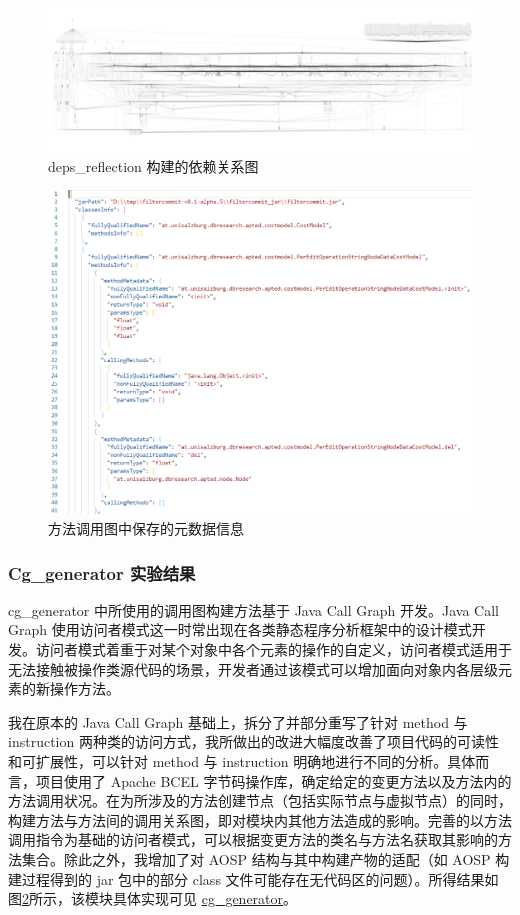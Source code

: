 \begin{figure}[htb]
    \centering
    \includegraphics[width=.9\textwidth]{figures/design-view.png}
    \caption{deps\_reflection 构建的依赖关系图}
    \label{fig:design-deps-reflection}
\end{figure}

\begin{figure}[htb]
    \centering
    \includegraphics[width=.6\textwidth]{figures/design-cg-generator.png}
    \caption{方法调用图中保存的元数据信息}
    \label{fig:design-cg-generator}
\end{figure}

\subsubsection{Cg\_generator 实验结果}

cg\_generator 中所使用的调用图构建方法基于 Java Call Graph 开发。Java Call Graph 使用访问者模式这一时常出现在各类静态程序分析框架中的设计模式开发。访问者模式着重于对某个对象中各个元素的操作的自定义，访问者模式适用于无法接触被操作类源代码的场景，开发者通过该模式可以增加面向对象内各层级元素的新操作方法\cite{gamma1994design}。

我在原本的 Java Call Graph 基础上，拆分了并部分重写了针对 method 与 instruction 两种类的访问方式，我所做出的改进大幅度改善了项目代码的可读性和可扩展性，可以针对 method 与 instruction 明确地进行不同的分析。具体而言，项目使用了 Apache BCEL 字节码操作库，确定给定的变更方法以及方法内的方法调用状况。在为所涉及的方法创建节点（包括实际节点与虚拟节点）的同时，构建方法与方法间的调用关系图，即对模块内其他方法造成的影响。完善的以方法调用指令为基础的访问者模式，可以根据变更方法的类名与方法名获取其影响的方法集合。除此之外，我增加了对 AOSP 结构与其中构建产物的适配（如 AOSP 构建过程得到的 jar 包中的部分 class 文件可能存在无代码区的问题）。所得结果如图\ref{fig:design-cg-generator}所示，该模块具体实现可见 \href{https://github.com/AOSPworking/cg_generator}{cg\_generator}。

